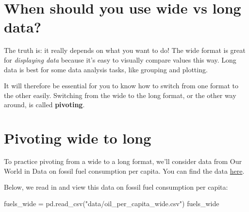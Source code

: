 \documentclass[
  letterpaper,
  DIV=11,
  numbers=noendperiod]{scrreprt}
\newenvironment{Shaded}{\begin{snugshade}}{\end{snugshade}}
\newcommand{\NormalTok}[1]{\textcolor[rgb]{0.00,0.23,0.31}{#1}}
\newcommand{\OperatorTok}[1]{\textcolor[rgb]{0.37,0.37,0.37}{#1}}
\newcommand{\StringTok}[1]{\textcolor[rgb]{0.13,0.47,0.30}{#1}}
\begin{document}
\section{When should you use wide vs long
data?}\label{when-should-you-use-wide-vs-long-data}

The truth is: it really depends on what you want to do! The wide format
is great for \emph{displaying data} because it's easy to visually
compare values this way. Long data is best for some data analysis tasks,
like grouping and plotting.

It will therefore be essential for you to know how to switch from one
format to the other easily. Switching from the wide to the long format,
or the other way around, is called \textbf{pivoting}.

\section{Pivoting wide to long}\label{pivoting-wide-to-long}

To practice pivoting from a wide to a long format, we'll consider data
from Our World in Data on fossil fuel consumption per capita. You can
find the data
\href{https://ourworldindata.org/grapher/fossil-fuels-per-capita}{here}.

Below, we read in and view this data on fossil fuel consumption per
capita:

\begin{Shaded}
\begin{Highlighting}[]
\NormalTok{fuels\_wide }\OperatorTok{=}\NormalTok{ pd.read\_csv(}\StringTok{"data/oil\_per\_capita\_wide.csv"}\NormalTok{)}
\NormalTok{fuels\_wide}
\end{Highlighting}
\end{Shaded}
\end{document}
